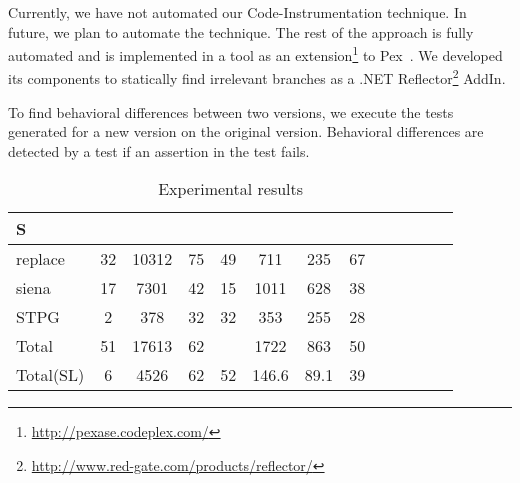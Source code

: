 Currently, we have not automated our Code-Instrumentation technique. In future, we plan to automate the technique.  
The rest of the approach is fully automated and is implemented in a tool as an extension\footnote{\url{http://pexase.codeplex.com/}} to Pex~\cite{Pex}. We developed its components to statically find irrelevant branches as a .NET Reflector\footnote{\url{http://www.red-gate.com/products/reflector/}} AddIn.

To find behavioral differences between two versions, we execute the tests generated for a new version on the original version.
Behavioral differences are detected by a test if an assertion in the test fails. 
  

\begin{table*}
\begin{CodeOut}
\begin{center}
\caption {\label{table:all_results}\scriptsize{Experimental results}}
\begin {tabular} {|l|c|c|c|c|c|c|c|c|c|c|c|c|}
\hline
S &\CenterCell{V} %
&\CenterCell{$P_{\CodeIn{Pex}}$}&\CenterCell{$P_{Red}(\%)$}
&\CenterCell{$M_p$}
&\CenterCell{$Tp_{\CodeIn{Pex}}$}&\CenterCell{$Ts$+ $T_d$}&\CenterCell{$Tp_{Red}(\%)$}
\\

\hline
replace	&32		&		10312	&	75	&	49		&		711	& 235	&		67	 \\ \hline
siena		&17		&		7301	&	42	&	15	&		1011	& 628&	38			\\ \hline
STPG		&2		&		378		&	32	&	32		&		353	&	255	& 28\\ \hline
Total		&51		&		17613	&	62		&			&		1722	&		863	& 50\\
\hline
Total(SL)&		6		&4526			&62		&52			&146.6&	89.1	&39\\


\end{tabular}
\end{center}
\end{CodeOut}
\end{table*}
